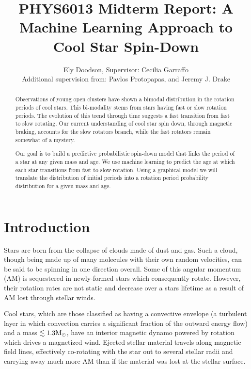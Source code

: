 \documentclass[fleqn,usenatbib]{mnras}
\title{PHYS6013 Midterm Report: A Machine Learning Approach to Cool Star Spin-Down}
\author[E. Doodson et al.]{
Ely Doodson,
 Supervisor: Cecilia Garraffo \\
Additional supervision from: Pavlos Protopapas,
and Jeremy J. Drake
}
\begin{document}
\label{firstpage}
\pagerange{\pageref{firstpage}--\pageref{lastpage}}
\maketitle

\begin{abstract}
	Observations of young open clusters have shown a bimodal distribution in the rotation
	periods of cool stars.
	This bi-modality stems from stars having fast or slow rotation periods.
	The evolution of this trend through time suggests a fast transition from fast to slow rotating.
	Our current understanding of cool star spin down, through magnetic braking, accounts for the slow rotators branch, while the fast rotators  remain somewhat of a mystery.

	Our goal is to build a predictive probabilistic spin-down model that links the period of a star at any given mass and age.
	We use machine learning to predict the age at which each star transitions from fast to slow-rotation.
	Using a graphical model we will translate the distribution of initial periods into a rotation period probability distribution for a given mass and age.
\end{abstract}


\section{Introduction}
Stars are born from the collapse of clouds made of dust and gas.
Such a cloud, though being made up of many molecules with their own random velocities, can be said to be spinning in one direction overall.
Some of this angular momentum (AM) is sequestered in newly-formed stars which consequently rotate.
However, their rotation rates are not static and decrease over a stars lifetime as a result of AM lost through stellar winds.

Cool stars, which are those classified as having a convective envelope (a turbulent layer in which convection carries a significant fraction of the outward energy flow) and a mass $\lesssim 1.3 \textup{M}_\odot$, have an interior magnetic dynamo powered by rotation which drives a magnetized wind. Ejected stellar material travels along magnetic field lines, effectively co-rotating with the star out to several stellar radii and carrying away much more AM than if the material was lost at the stellar surface. 
\end{document}

